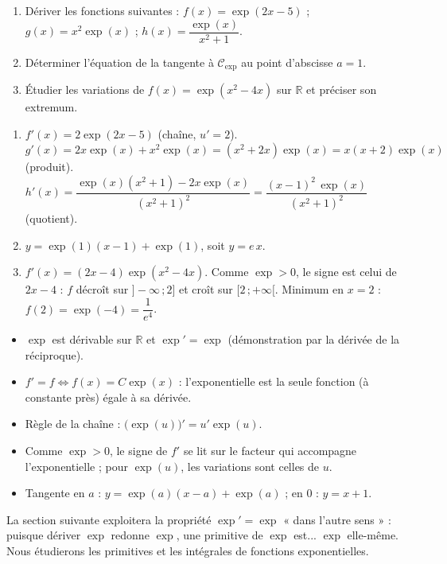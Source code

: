 \documentclass[11pt]{article}
\begin{document}
\begin{exercice}
\begin{enumerate}
\item Dériver les fonctions suivantes : $f(x) = \exp(2x-5)$ ; $g(x) = x^2\exp(x)$ ; $h(x) = \dfrac{\exp(x)}{x^2+1}$.
\item Déterminer l'équation de la tangente à $\mathcal{C}_{\exp}$ au point d'abscisse $a = 1$.
\item Étudier les variations de $f(x) = \exp(x^2 - 4x)$ sur $\mathbb{R}$ et préciser son extremum.
\end{enumerate}
\end{exercice}

\begin{corrige}[Exercice 3]
\begin{enumerate}
\item $f'(x) = 2\exp(2x-5)$ (chaîne, $u'=2$). $g'(x) = 2x\exp(x) + x^2\exp(x) = (x^2+2x)\exp(x) = x(x+2)\exp(x)$ (produit). $h'(x) = \dfrac{\exp(x)(x^2+1) - 2x\exp(x)}{(x^2+1)^2} = \dfrac{(x-1)^2\,\exp(x)}{(x^2+1)^2}$ (quotient).
\item $y = \exp(1)(x-1) + \exp(1)$, soit $y = e\,x$.
\item $f'(x) = (2x-4)\exp(x^2-4x)$. Comme $\exp > 0$, le signe est celui de $2x-4$ : $f$ décroît sur $]-\infty\,;2]$ et croît sur $[2\,;+\infty[$. Minimum en $x=2$ : $f(2) = \exp(-4) = \dfrac{1}{e^4}$.
\end{enumerate}
\end{corrige}

\begin{aretenir}
\begin{itemize}
\item $\exp$ est dérivable sur $\mathbb{R}$ et $\exp' = \exp$ (démonstration par la dérivée de la réciproque).
\item $f' = f \iff f(x) = C\exp(x)$ : l'exponentielle est la seule fonction (à constante près) égale à sa dérivée.
\item Règle de la chaîne : $\bigl(\exp(u)\bigr)' = u'\exp(u)$.
\item Comme $\exp > 0$, le signe de $f'$ se lit sur le facteur qui accompagne l'exponentielle ; pour $\exp(u)$, les variations sont celles de $u$.
\item Tangente en $a$ : $y = \exp(a)(x-a) + \exp(a)$ ; en $0$ : $y = x+1$.
\end{itemize}
\end{aretenir}

La section suivante exploitera la propriété $\exp' = \exp$ « dans l'autre sens » : puisque dériver $\exp$ redonne $\exp$, une primitive de $\exp$ est... $\exp$ elle-même. Nous étudierons les primitives et les intégrales de fonctions exponentielles.
\end{document}
